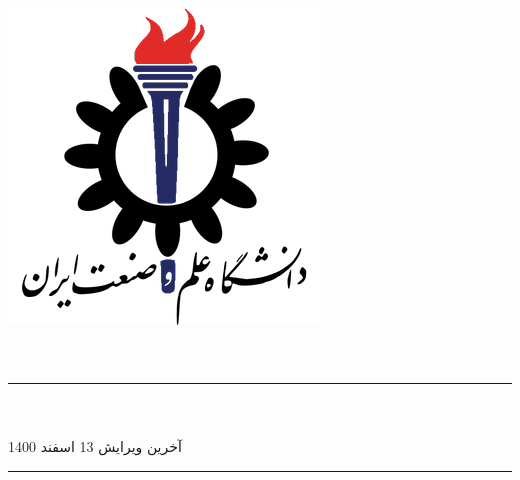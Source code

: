 \begin{titlepage}
    \centering
    \includegraphics[scale = 0.5]{Images/IUSTLogo.png}\\
    \Huge{\Faculty}\\[0.2 cm]
    \huge{\Course}\\[0.2 cm]
    \LARGE{\Semester}
    
    \rule{\linewidth}{1.0 mm}
    \huge{\Subject}\\[0.2 cm]
    \LARGE{\Title}\\[0.4 cm]
    \large{آخرین ویرایش 13 اسفند 1400}
    \rule{\linewidth}{1.0 mm}\\[1.0 cm]
    
    \LARGE
    \begin{minipage}{0.95 \textwidth}
        \centering
	    \Prof \dotfill \prof\\[0.15 cm]
	    \Members \dotfill \members\\[0.15 cm]
	    \SID \dotfill \sid\\[0.15 cm]
	\end{minipage}

\end{titlepage}